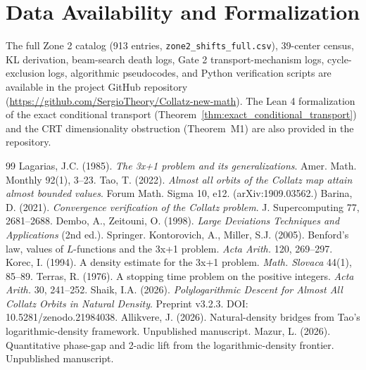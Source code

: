 \documentclass[12pt,a4paper]{article}
\theoremstyle{remark}
\begin{document}
\section*{Data Availability and Formalization}
The full Zone 2 catalog (913 entries, \texttt{zone2\_shifts\_full.csv}), 39-center census, KL derivation, beam-search death logs, Gate 2 transport-mechanism logs, cycle-exclusion logs, algorithmic pseudocodes, and Python verification scripts are available in the project GitHub repository (\url{https://github.com/SergioTheory/Collatz-new-math}). The Lean 4 formalization of the exact conditional transport (Theorem~\ref{thm:exact_conditional_transport}) and the CRT dimensionality obstruction (Theorem~M1) are also provided in the repository.

\begin{thebibliography}{99}
 Lagarias, J.C. (1985). \textit{The 3x+1 problem and its generalizations}. Amer. Math. Monthly 92(1), 3--23.
 Tao, T. (2022). \textit{Almost all orbits of the Collatz map attain almost bounded values}. Forum Math. Sigma 10, e12. (arXiv:1909.03562.)
 Barina, D. (2021). \textit{Convergence verification of the Collatz problem}. J. Supercomputing 77, 2681--2688.
 Dembo, A., Zeitouni, O. (1998). \textit{Large Deviations Techniques and Applications} (2nd ed.). Springer.
 Kontorovich, A., Miller, S.J. (2005). Benford's law, values of $L$-functions and the 3x+1 problem. \textit{Acta Arith.} 120, 269--297.
 Korec, I. (1994). A density estimate for the 3x+1 problem. \textit{Math. Slovaca} 44(1), 85--89.
 Terras, R. (1976). A stopping time problem on the positive integers. \textit{Acta Arith.} 30, 241--252.
 Shaik, I.A. (2026). \textit{Polylogarithmic Descent for Almost All Collatz Orbits in Natural Density}. Preprint v3.2.3. DOI: 10.5281/zenodo.21984038.
 Allikvere, J. (2026). Natural-density bridges from Tao's logarithmic-density framework. Unpublished manuscript.
 Mazur, L. (2026). Quantitative phase-gap and 2-adic lift from the logarithmic-density frontier. Unpublished manuscript.
\end{thebibliography}

\appendix
\end{document}
